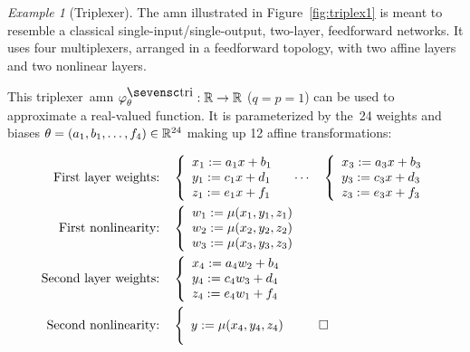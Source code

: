 \documentclass[10pt]{article}
\newcommand{\amn}{\varphi}
\theoremstyle{remark}
\newtheorem{example}{Example}
\theoremstyle{definition}
\theoremstyle{plain}
\begin{document}
\begin{example}[Triplexer]\label{ex:triplex}
The \acs{amn} illustrated in Figure~\ref{fig:triplex1} is meant to resemble a
classical single-input/single-output, two-layer, feedforward networks.  It uses four
multiplexers, arranged in a feedforward topology, with two affine layers and
two nonlinear layers.

This triplexer~\acs{amn} 
$\amn^\mathsc{tri}_\theta : \reals\to\reals$ ($q=p=1$)
can be used to approximate a real-valued function.  It
is parameterized by the~24 weights and biases $\theta = (a_1,b_1,\ldots,f_4)
\in \mathbb{R}^{24}$ making up 12 affine transformations:

\begin{align*}
	\text{First layer weights:}
	\quad
	&\left\{
		\begin{array}{l}
			x_1 := a_1x + b_1\\
			y_1 := c_1x + d_1\\
			z_1 := e_1x + f_1
		\end{array}
	\right.
	\quad\cdots\quad
	\left\{
		\begin{array}{l}
			x_3 := a_3x + b_3\\
			y_3 := c_3x + d_3\\
			z_3 := e_3x + f_3
		\end{array}
	\right.\\
	\text{First nonlinearity:}
	\quad
	&\left\{
		\begin{array}{l}
			w_1 := \mu(x_1, y_1, z_1)\\
			w_2 := \mu(x_2, y_2, z_2)\\
			w_3 := \mu(x_3, y_3, z_3)
		\end{array}
	\right.\\
	\text{Second layer weights:}
	\quad
	&\left\{
		\begin{array}{l}
			x_4 := a_4w_2 + b_4\\
			y_4 := c_4w_3 + d_4\\
			z_4 := e_4w_1 + f_4
		\end{array}
	\right.\\
	\text{Second nonlinearity:}
	\quad
	&\left\{
		\begin{array}{l}
			\vspace{-1ex}\\
			y := \mu(x_4,y_4,z_4)\\
			\vspace{-1ex}
		\end{array}
	\right.
	\qed
\end{align*}
\end{example}
\end{document}
